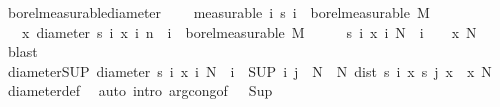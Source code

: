 \begin{isabellebody}
\isanewline
\isanewline
{}\isamarkupfalse%
\ borel{\isacharunderscore}{\kern0pt}measurable{\isacharunderscore}{\kern0pt}diameter{\isacharcolon}{\kern0pt}\ \isanewline
\ \ \ {\isacharbrackleft}{\kern0pt}measurable{\isacharbrackright}{\kern0pt}{\isacharcolon}{\kern0pt}\ {\isachardoublequoteopen}{\isasymAnd}i{\isachardot}{\kern0pt}\ {\isacharparenleft}{\kern0pt}s\ i{\isacharparenright}{\kern0pt}\ {\isasymin}\ borel{\isacharunderscore}{\kern0pt}measurable\ M{\isachardoublequoteclose}\isanewline
\ \ \ {\isachardoublequoteopen}{\isacharparenleft}{\kern0pt}{\isasymlambda}x{\isachardot}{\kern0pt}\ diameter\ {\isacharbraceleft}{\kern0pt}s\ i\ x\ {\isacharbar}{\kern0pt}i{\isachardot}{\kern0pt}\ n\ {\isasymle}\ i{\isacharbraceright}{\kern0pt}{\isacharparenright}{\kern0pt}\ {\isasymin}\ borel{\isacharunderscore}{\kern0pt}measurable\ M{\isachardoublequoteclose}\isanewline
%
\isadelimproof
%
\endisadelimproof
%
\isatagproof
{}\isamarkupfalse%
\ {\isacharminus}{\kern0pt}\isanewline
\ \ \isamarkupfalse%
\ {\isachardoublequoteopen}{\isacharbraceleft}{\kern0pt}s\ i\ x\ {\isacharbar}{\kern0pt}i{\isachardot}{\kern0pt}\ N\ {\isasymle}\ i{\isacharbraceright}{\kern0pt}\ {\isasymnoteq}\ {\isacharbraceleft}{\kern0pt}{\isacharbraceright}{\kern0pt}{\isachardoublequoteclose}\ \ x\ N\ \isamarkupfalse%
\ blast\isanewline
\ \ \isamarkupfalse%
\ diameter{\isacharunderscore}{\kern0pt}SUP{\isacharcolon}{\kern0pt}\ {\isachardoublequoteopen}diameter\ {\isacharbraceleft}{\kern0pt}s\ i\ x\ {\isacharbar}{\kern0pt}i{\isachardot}{\kern0pt}\ N\ {\isasymle}\ i{\isacharbraceright}{\kern0pt}\ {\isacharequal}{\kern0pt}\ {\isacharparenleft}{\kern0pt}SUP\ {\isacharparenleft}{\kern0pt}i{\isacharcomma}{\kern0pt}\ j{\isacharparenright}{\kern0pt}\ {\isasymin}\ {\isacharbraceleft}{\kern0pt}N{\isachardot}{\kern0pt}{\isachardot}{\kern0pt}{\isacharbraceright}{\kern0pt}\ {\isasymtimes}\ {\isacharbraceleft}{\kern0pt}N{\isachardot}{\kern0pt}{\isachardot}{\kern0pt}{\isacharbraceright}{\kern0pt}{\isachardot}{\kern0pt}\ dist\ {\isacharparenleft}{\kern0pt}s\ i\ x{\isacharparenright}{\kern0pt}\ {\isacharparenleft}{\kern0pt}s\ j\ x{\isacharparenright}{\kern0pt}{\isacharparenright}{\kern0pt}{\isachardoublequoteclose}\ \ x\ N\ \isamarkupfalse%
\ diameter{\isacharunderscore}{\kern0pt}def\ \isamarkupfalse%
\ {\isacharparenleft}{\kern0pt}auto\ intro{\isacharbang}{\kern0pt}{\isacharcolon}{\kern0pt}\ arg{\isacharunderscore}{\kern0pt}cong{\isacharbrackleft}{\kern0pt}of\ {\isacharunderscore}{\kern0pt}\ {\isacharunderscore}{\kern0pt}\ Sup{\isacharbrackright}{\kern0pt}{\isacharparenright}{\kern0pt}\isanewline

\end{isabellebody}
